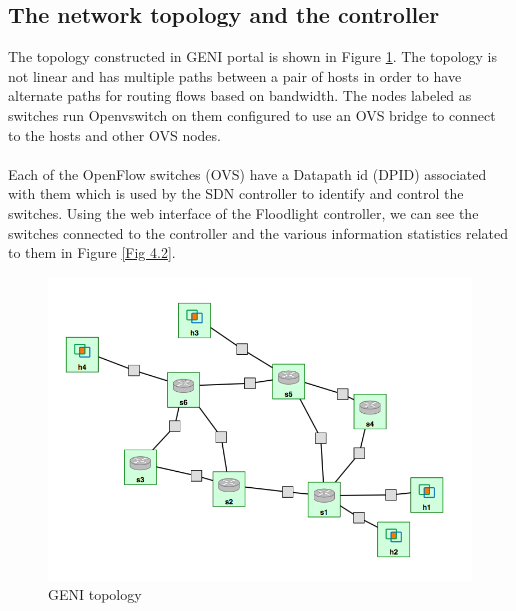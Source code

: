 \documentclass[paper=a4, fontsize=12pt]{scrartcl}	%
\numberwithin{equation}{section}		%
\numberwithin{figure}{section}			%
\numberwithin{table}{section}				%
\begin{document}
\subsection{The network topology and the controller}
The topology constructed in GENI portal is shown in Figure \ref{Fig 4.1}. The topology is not linear and has multiple paths between a pair of hosts in order to have alternate paths for routing flows based on bandwidth. The nodes labeled as switches run Openvswitch on them configured to use an OVS bridge to connect to the hosts and other OVS nodes.
\\
\\
Each of the OpenFlow switches (OVS) have a Datapath id (DPID) associated with them which is used by the SDN controller to identify and control the switches. Using the web interface of the Floodlight controller, we can see the switches connected to the controller and the various information statistics related to them in Figure \ref{Fig 4.2}.
\begin{figure}[H]
\begin{center}
\includegraphics[scale=0.4]{topology.png}   
\end{center}
 \caption{GENI topology}
 \label{Fig 4.1}
\end{figure}
\end{document}
